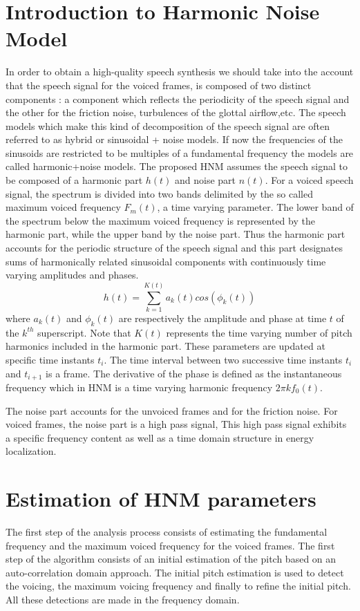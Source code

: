 \documentclass[BTech]{nitkdiss}
\begin{document}
\section{Introduction to Harmonic Noise Model}

In order to obtain a high-quality speech synthesis we should take into the account that the speech signal for the voiced frames, is composed of two distinct components : a component which reflects the periodicity of the speech signal and the other for the friction noise, turbulences of the glottal airflow,etc. The speech models which make this kind of decomposition of the speech signal are often referred to as hybrid or sinusoidal + noise models. If now the frequencies of the sinusoids are restricted to be multiples of a fundamental frequency the models are called harmonic+noise models. The proposed HNM assumes the speech signal to be composed of a harmonic part $h(t)$ and noise part $n(t)$. For a voiced speech signal, the spectrum is divided into two bands delimited by the so called maximum voiced frequency $F_{m}(t)$, a time varying parameter. The lower band of the spectrum below the maximum voiced frequency is represented by the harmonic part, while the upper band by the noise part. Thus the harmonic part accounts for the periodic structure of the speech signal and this part designates sums of harmonically related sinusoidal components with continuously time varying amplitudes and phases.$$h(t)=\sum_{k=1}^{K(t)}a_{k}(t)cos(\phi_{k}(t))$$ where $a_{k}(t)$ and $\phi_{k}(t)$ are respectively the amplitude and phase at time $t$ of the $k^{th}$ superscript. Note that $K(t)$ represents the time varying number of pitch harmonics included in the harmonic part. These parameters are updated at specific time instants $t_{i}$. The time interval between two successive time instants $t_{i}$ and $t_{i+1}$ is a frame. The derivative of the phase is defined as the instantaneous frequency which in HNM is a time varying harmonic frequency $2\pi kf_{0}(t)$. 

The noise part accounts for the unvoiced frames and for the friction noise. For voiced frames, the noise part is a high pass signal, This high pass signal exhibits a specific frequency content as well as a time domain structure in energy localization.

\section{Estimation of HNM parameters}
The first step of the analysis process consists of estimating the fundamental frequency and the maximum voiced frequency for the voiced frames. The first step of the algorithm consists of an initial estimation of the pitch based on an auto-correlation domain approach. The initial pitch estimation is used to detect the voicing, the maximum voicing frequency and finally to refine the initial pitch. All these detections are made in the frequency domain.
\end{document}
